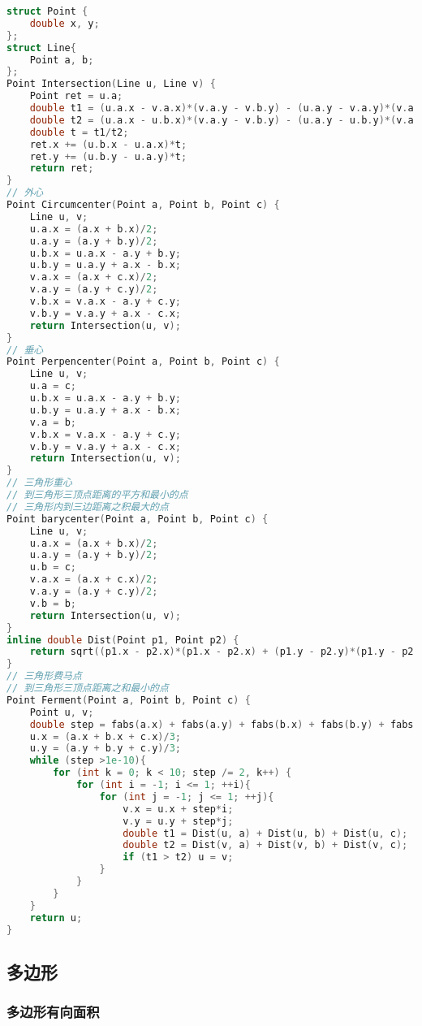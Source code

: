 \begin{lstlisting}[language=C++]
struct Point {
    double x, y;
};
struct Line{
    Point a, b;
};
Point Intersection(Line u, Line v) {
    Point ret = u.a;
    double t1 = (u.a.x - v.a.x)*(v.a.y - v.b.y) - (u.a.y - v.a.y)*(v.a.x - v.b.x);
    double t2 = (u.a.x - u.b.x)*(v.a.y - v.b.y) - (u.a.y - u.b.y)*(v.a.x - v.b.x);
    double t = t1/t2;
    ret.x += (u.b.x - u.a.x)*t;
    ret.y += (u.b.y - u.a.y)*t;
    return ret;
}
// 外心
Point Circumcenter(Point a, Point b, Point c) {
    Line u, v;
    u.a.x = (a.x + b.x)/2;
    u.a.y = (a.y + b.y)/2;
    u.b.x = u.a.x - a.y + b.y;
    u.b.y = u.a.y + a.x - b.x;
    v.a.x = (a.x + c.x)/2;
    v.a.y = (a.y + c.y)/2;
    v.b.x = v.a.x - a.y + c.y;
    v.b.y = v.a.y + a.x - c.x;
    return Intersection(u, v);
}
// 垂心
Point Perpencenter(Point a, Point b, Point c) {
    Line u, v;
    u.a = c;
    u.b.x = u.a.x - a.y + b.y;
    u.b.y = u.a.y + a.x - b.x;
    v.a = b;
    v.b.x = v.a.x - a.y + c.y;
    v.b.y = v.a.y + a.x - c.x;
    return Intersection(u, v);
}
// 三角形重心
// 到三角形三顶点距离的平方和最小的点
// 三角形内到三边距离之积最大的点
Point barycenter(Point a, Point b, Point c) {
    Line u, v;
    u.a.x = (a.x + b.x)/2;
    u.a.y = (a.y + b.y)/2;
    u.b = c;
    v.a.x = (a.x + c.x)/2;
    v.a.y = (a.y + c.y)/2;
    v.b = b;
    return Intersection(u, v);
}
inline double Dist(Point p1, Point p2) {
    return sqrt((p1.x - p2.x)*(p1.x - p2.x) + (p1.y - p2.y)*(p1.y - p2.y));
}
// 三角形费马点
// 到三角形三顶点距离之和最小的点
Point Ferment(Point a, Point b, Point c) {
    Point u, v;
    double step = fabs(a.x) + fabs(a.y) + fabs(b.x) + fabs(b.y) + fabs(c.x) + fabs(c.y);
    u.x = (a.x + b.x + c.x)/3;
    u.y = (a.y + b.y + c.y)/3;
    while (step >1e-10){
        for (int k = 0; k < 10; step /= 2, k++) {
            for (int i = -1; i <= 1; ++i){
                for (int j = -1; j <= 1; ++j){
                    v.x = u.x + step*i;
                    v.y = u.y + step*j;
                    double t1 = Dist(u, a) + Dist(u, b) + Dist(u, c);
                    double t2 = Dist(v, a) + Dist(v, b) + Dist(v, c);
                    if (t1 > t2) u = v;
                }
            }
        }
    }
    return u;
}
\end{lstlisting}

\subsection{多边形}

\subsubsection{多边形有向面积}

